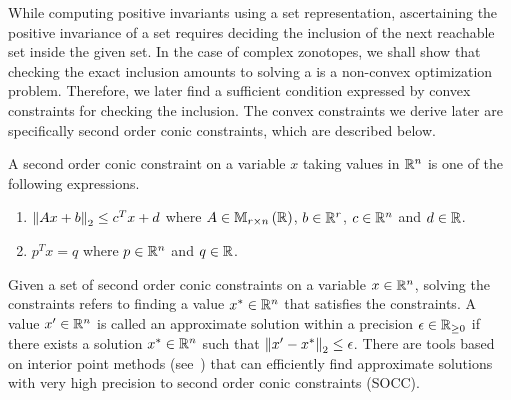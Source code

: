 While computing positive invariants using a set representation,
ascertaining the positive invariance of a set requires deciding the
inclusion of the next reachable set inside the given set.  In the case
of complex zonotopes, we shall show that checking the exact inclusion
amounts to solving a is a non-convex optimization problem.  Therefore,
we later find a sufficient condition expressed by convex constraints
for checking the inclusion.  The convex constraints we derive later
are specifically second order conic constraints, which are described
below.
%
\begin{definition}
A second order conic constraint on a variable $x$ taking values in
$\mathbb{R}^n$ is one of the following expressions.
\begin{enumerate}
\item $\left\|Ax+b\right\|_{2}\leq c^Tx+d$ where $A\in\mathbb{M}_{r\times n}\left(\mathbb{R}\right)$,
  $b\in\mathbb{R}^r$, $c\in\mathbb{R}^n$ and $d\in\mathbb{R}$.
\item $p^Tx=q$ where $p\in\mathbb{R}^n$ and $q\in\mathbb{R}$.
\end{enumerate}
\end{definition}
%
Given a set of second order conic constraints on a variable
$x\in\mathbb{R}^n$, solving the constraints refers to finding a value
$x^*\in\mathbb{R}^n$ that satisfies the constraints.  A value
$x^\prime\in\mathbb{R}^n$ is called an approximate solution within a
precision $\epsilon\in\mathbb{R}_{\geq 0}$ if there exists a solution
$x^*\in\mathbb{R}^n$ such that $\left\|x^\prime-x^*\right\|_{2}\leq \epsilon$.  There
are tools based on interior point methods (see~\cite{grant2008cvx})
that can efficiently find approximate solutions with very high
precision to second order conic constraints (SOCC).

